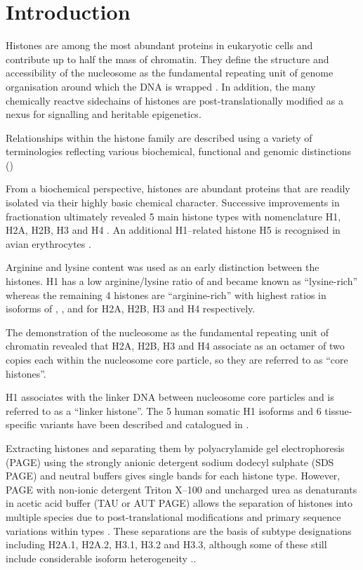 \section{Introduction}

  Histones are among the most abundant proteins in eukaryotic cells and contribute up to half the mass of chromatin. 
  They define the structure and accessibility of the nucleosome as the fundamental repeating unit of genome organisation 
  around which the DNA is wrapped .
  In addition, the many chemically reactve sidechains of histones are post-translationally modified 
  as a nexus for signalling and heritable epigenetics. 

  Relationships within the histone family are described using a variety of terminologies
  reflecting various biochemical, functional and genomic distinctions ()
  
  From a biochemical perspective, histones are abundant proteins 
  that are readily isolated via their highly basic chemical character. 
  Successive improvements in fractionation ultimately revealed 5 main histone types 
  with nomenclature H1, H2A, H2B, H3 and H4 \citep{nomenclature}.
  An additional H1--related histone H5 is recognised in avian erythrocytes \citep{HFive-review}.

  Arginine and lysine content was used as an early distinction between the histones. 
  H1 has a low arginine/lysine ratio of \LinkerArgLysRatio{} and became known as ``lysine-rich'' 
  whereas the remaining 4 histones are ``arginine-rich'' with highest ratios in isoforms of 
  \HTwoAArgLysRatio{}, \HTwoBArgLysRatio{}, \HThreeArgLysRatio{} and \HFourArgLysRatio{}
  for H2A, H2B, H3 and H4 respectively.

  The demonstration of the nucleosome as the fundamental repeating unit of chromatin  
  revealed that H2A, H2B, H3 and H4 associate as an octamer of two copies each within the
  nucleosome core particle, so they are referred to as ``core histones''. 
  
  H1 associates with the linker DNA between nucleosome core particles and is referred to as a ``linker histone''. 
  The 5 human somatic H1 isoforms and 6 tissue-specific variants 
  have been described and catalogued in .

  Extracting histones and separating them by polyacrylamide gel electrophoresis (PAGE) 
  using the strongly anionic detergent sodium dodecyl sulphate (SDS PAGE) and neutral buffers 
  gives single bands for each histone type. 
  However, PAGE with non-ionic detergent Triton X--100 and uncharged urea as denaturants
  in acetic acid buffer (TAU or AUT PAGE) allows the separation of histones into multiple species 
  due to post-translational modifications and primary sequence variations within types \citep{PAGEND}. 
  These separations are the basis of subtype designations including H2A.1, H2A.2, H3.1, H3.2 and H3.3, 
  although some of these still include considerable isoform heterogeneity \addref{}..

